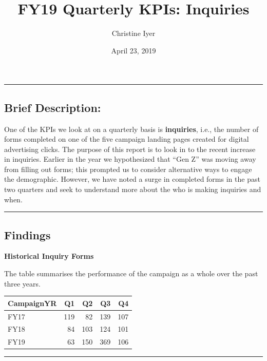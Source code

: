 \documentclass[]{tufte-handout}
\title{FY19 Quarterly KPIs: Inquiries}
\author{Christine Iyer}
\date{April 23, 2019}
\begin{document}
\maketitle




\begin{center}\rule{0.5\linewidth}{\linethickness}\end{center}

\subsection{Brief Description:}\label{brief-description}

One of the KPIs we look at on a quarterly basis is \textbf{inquiries},
i.e., the number of forms completed on one of the five campaign landing
pages created for digital advertising clicks. The purpose of this report
is to look in to the recent increase in inquiries. Earlier in the year
we hypothesized that ``Gen Z'' was moving away from filling out forms;
this prompted us to consider alternative ways to engage the demographic.
However, we have noted a surge in completed forms in the past two
quarters and seek to understand more about the who is making inquiries
and when.

\begin{center}\rule{0.5\linewidth}{\linethickness}\end{center}

\subsection{Findings}\label{findings}

\textbf{Historical Inquiry Forms}

The table summarises the performance of the campaign as a whole over the
past three years.

\begin{longtable}[]{@{}lrrrr@{}}
\toprule
CampaignYR & Q1 & Q2 & Q3 & Q4\tabularnewline
\midrule
\endhead
FY17 & 119 & 82 & 139 & 107\tabularnewline
FY18 & 84 & 103 & 124 & 101\tabularnewline
FY19 & 63 & 150 & 369 & 106\tabularnewline
\bottomrule
\end{longtable}

\begin{center}\rule{0.5\linewidth}{\linethickness}\end{center}
\end{document}

